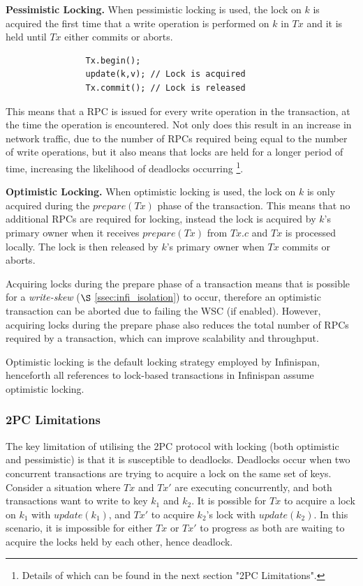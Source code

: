             \textbf{Pessimistic Locking.}
            When pessimistic locking\citep{Bernstein:1981:CCD:356842.356846} is used, the lock on $k$ is acquired the first time that a write operation is performed on $k$ in $Tx$ and it is held until $Tx$ either commits or aborts.  
	       		    
		    \begin{lstlisting}
		    	Tx.begin();
		    	update(k,v); // Lock is acquired
		    	Tx.commit(); // Lock is released
		    \end{lstlisting}

            This means that a RPC is issued for every write operation in the transaction, at the time the operation is encountered.  Not only does this result in an increase in network traffic, due to the number of RPCs required being equal to the number of write operations, but it also means that locks are held for a longer period of time, increasing the likelihood of deadlocks occurring \footnote{Details of which can be found in the next section "2PC Limitations".}.
            
	        \textbf{Optimistic Locking.}
	        When optimistic locking\citep{Kung:1981:OMC:319566.319567} is used, the lock on $k$ is only acquired during the $prepare(Tx)$ phase of the transaction.  This means that no additional RPCs are required for locking, instead the lock is acquired by $k$'s primary owner when it receives $prepare(Tx)$ from $Tx.c$ and $Tx$ is processed locally.  The lock is then released by $k$'s primary owner when $Tx$ commits or aborts.  
	        
	        Acquiring locks during the prepare phase of a transaction means that is possible for a  \emph{write-skew} ($\S$ \ref{ssec:infi_isolation}) to occur, therefore an optimistic transaction can be aborted due to failing the WSC (if enabled).  However, acquiring locks during the prepare phase also reduces the total number of RPCs required by a transaction, which can improve scalability and throughput.  
	        
	        Optimistic locking is the default locking strategy employed by Infinispan, henceforth all references to lock-based transactions in Infinispan assume optimistic locking.  
	        
	        \subsubsection*{2PC Limitations}
	        The key limitation of utilising the 2PC protocol with locking (both optimistic and pessimistic) is that it is susceptible to deadlocks.  Deadlocks occur when two concurrent transactions are trying to acquire a lock on the same set of keys.  Consider a situation where $Tx$ and $Tx'$ are executing concurrently, and both transactions want to write to key $k_1$ and $k_2$.  It is possible for $Tx$ to acquire a lock on $k_1$ with $update(k_1)$, and $Tx'$ to acquire $k_2$'s lock with $update(k_2)$.  In this scenario, it is impossible for either $Tx$ or $Tx'$ to progress as both are waiting to acquire the locks held by each other, hence deadlock.  
	        
